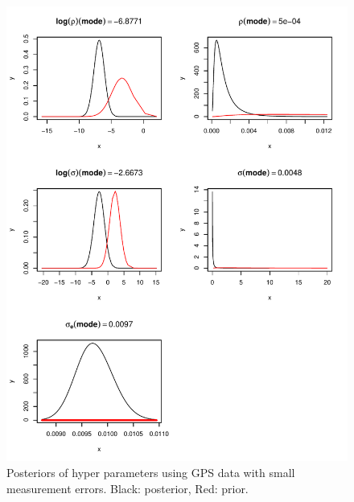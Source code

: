 \documentclass[a4paper,12pt]{article}
\begin{document}
 \begin{figure}[htbp]
 \begin{center}
 \includegraphics[scale = 0.8]{fig/sMesh_sErr_hyperpar.pdf}
 \end{center}
 \caption[Hyper parameter with small errors]{Posteriors of hyper parameters using GPS data with small measurement errors. Black: posterior, Red: prior.}
 \label{fig:1}
 \end{figure}
\end{document}

